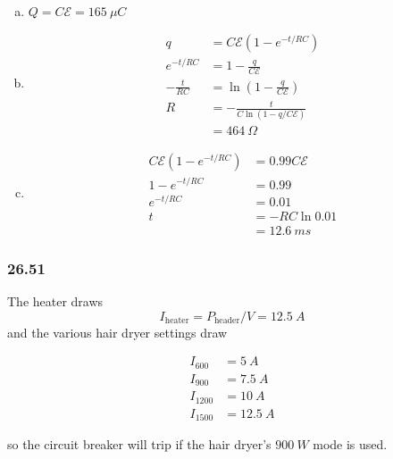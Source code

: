 \documentclass{article}
\begin{document}
\begin{enumerate}[(a)]
  \item $Q = C \mathcal{E} = \qty{165}{\mu C}$

  \item

        \begin{align*}
          q              & = C \mathcal{E} (1 - e^{-t / R C})               \\
          e^{-t / RC}    & = 1 - \frac{q}{C \mathcal{E}}                    \\
          -\frac{t}{R C} & = \ln \left( 1 - \frac{q}{C \mathcal{E}} \right) \\
          R              & = -\frac{t}{C \ln (1 - q / C \mathcal{E})}       \\
                         & = \qty{464}{\Omega}
        \end{align*}

  \item

        \begin{align*}
          C \mathcal{E} (1 - e^{-t / R C}) & = 0.99 C \mathcal{E} \\
          1 - e^{-t / R C}                 & = 0.99               \\
          e^{-t / R C}                     & = 0.01               \\
          t                                & = -R C \ln 0.01      \\
                                           & = \qty{12.6}{ms}
        \end{align*}
\end{enumerate}

\subsubsection{26.51}

The heater draws \[I_\textrm{heater} = P_\textrm{header} / V = \qty{12.5}{A}\] and the various hair dryer settings draw

\begin{align*}
  I_{600}  & = \qty{5}{A}    \\
  I_{900}  & = \qty{7.5}{A}  \\
  I_{1200} & = \qty{10}{A}   \\
  I_{1500} & = \qty{12.5}{A}
\end{align*}

so the circuit breaker will trip if the hair dryer's $\qty{900}{W}$ mode is used.
\end{document}
